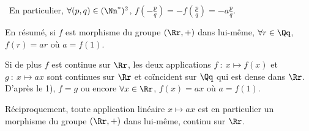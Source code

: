 {\begin{enumerate}
{\textbullet~En particulier, $\forall(p,q)\in(\Nn^*)^2$, $f\left(- \frac{p}{q}\right) = -f\left( \frac{p}{q}\right)= - a \frac{p}{q}$.

En résumé, si $f$ est morphisme du groupe $(\Rr,+)$ dans lui-même, $\forall r\in\Qq$, $f(r) = ar$ où $a = f(1)$.

Si de plus $f$ est continue sur $\Rr$, les deux applications $f~:~x\mapsto f(x)$ et $g~:~x\mapsto ax$ sont continues sur $\Rr$ et coïncident sur $\Qq$ qui est dense dans $\Rr$. D'après le 1), $f = g$ ou encore $\forall x\in\Rr$, $f(x)=ax$ où $a=f(1)$.

Réciproquement, toute application linéaire $x\mapsto ax$ est en particulier un morphisme du groupe $(\Rr,+)$ dans lui-même, continu sur $\Rr$. 

\begin{center}
\end{center}}
\end{enumerate}
}
